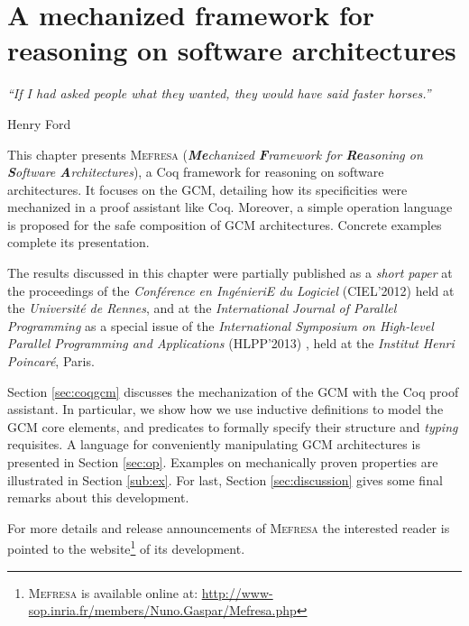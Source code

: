 \chapter{A mechanized framework for reasoning on software architectures}
\label{chap:mefresa} 
\epigraph{\textit{“If I had asked people what they wanted, they would have said faster horses.”}}{Henry Ford}
	
\minitoc

	
This chapter presents \textsc{Mefresa} (\textit{\textbf{Me}chanized \textbf{F}ramework for \textbf{Re}asoning on \textbf{S}oftware \textbf{A}rchitectures}), a Coq framework for reasoning on software architectures.
	It focuses on the \ac{GCM}, detailing how its specificities were mechanized in a proof assistant like Coq. 
	Moreover, a simple \textsf{operation} language is proposed for the safe composition of 
	\ac{GCM} architectures. Concrete examples complete its presentation.
		
	The results discussed in this chapter were partially published as a \textit{short paper} at the proceedings
	of the \textit{Conf\'erence en Ing\'enieriE du Logiciel} (CIEL'2012) \cite{gaspar:hal-00725291} held
	at the \textit{Universit\'e de Rennes},
	and at the \textit{International Journal of Parallel Programming} as a special issue
	of the \textit{International Symposium on High-level Parallel Programming and Applications} (HLPP'2013) \cite{GASHENMAD:IJPP13},
	held at the \textit{Institut Henri Poincar\'e}, Paris.	
	
	Section \ref{sec:coqgcm} discusses the mechanization of the \ac{GCM} with the Coq
	proof assistant. In particular, we show how we use inductive definitions to model
	the \ac{GCM} core elements, and predicates to formally specify their structure
	and \textit{typing} requisites.
	A language for conveniently manipulating \ac{GCM} architectures
	is presented in Section \ref{sec:op}. Examples on mechanically proven properties
	are illustrated in Section \ref{sub:ex}.	For last, Section \ref{sec:discussion} gives
	some final remarks about this development.
	 
		
	For more details and release announcements of \textsc{Mefresa} 
	the interested reader is pointed to the website\footnote{\textsc{Mefresa}  is available online at: 
	\url{http://www-sop.inria.fr/members/Nuno.Gaspar/Mefresa.php}} of its development. 
